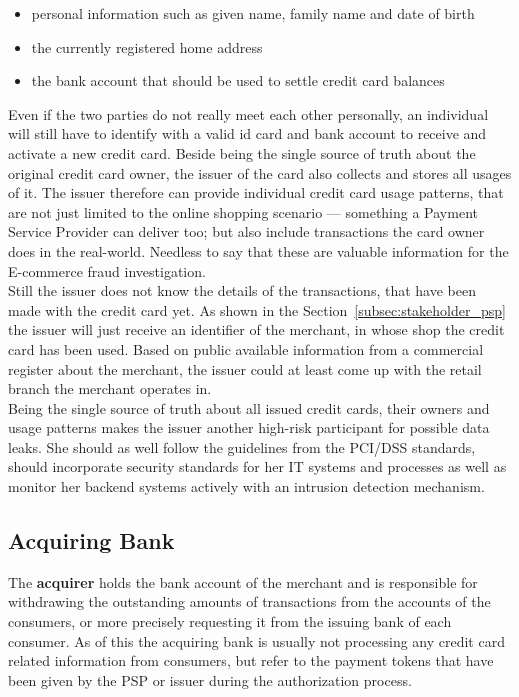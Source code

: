 \begin{itemize}
		\item personal information such as given name, family name and date of birth
		\item the currently registered home address
		\item the bank account that should be used to settle credit card balances
\end{itemize}

Even if the two parties do not really meet each other personally, an individual will still have to identify with a valid id card and bank account to receive and activate a new credit card. Beside being the single source of truth about the original credit card owner, the issuer of the card also collects and stores all  usages of it. The issuer therefore can provide individual credit card usage patterns, that are not just limited to the online shopping scenario --- something a Payment Service Provider can deliver too; but also include transactions the card owner does in the real-world. Needless to say that these are valuable information for the E-commerce fraud investigation. \\

Still the issuer does not know the details of the transactions, that have been made with the credit card yet. As shown in the Section~\ref{subsec:stakeholder_psp} the issuer will just receive an identifier of the merchant, in whose shop the credit card has been used. Based on public available information from a commercial register about the merchant, the issuer could at least come up with the retail branch the merchant operates in. \\

Being the single source of truth about all issued credit cards, their owners and usage patterns makes the issuer another high-risk participant for possible data leaks. She should as well follow the guidelines from the PCI/DSS standards, should incorporate security standards for her IT systems and processes as well as monitor her backend systems actively with an intrusion detection mechanism.


\subsection{Acquiring Bank}
\label{subsec:stakeholder_acquirer}

The \textbf{acquirer} holds the bank account of the merchant and is responsible for withdrawing the outstanding amounts of transactions from the accounts of the consumers, or more precisely requesting it from the issuing bank of each consumer. As of this the acquiring bank is usually not processing any credit card related information from consumers, but refer to the payment tokens that have been given by the \gls{PSP} or issuer during the authorization process. \\

